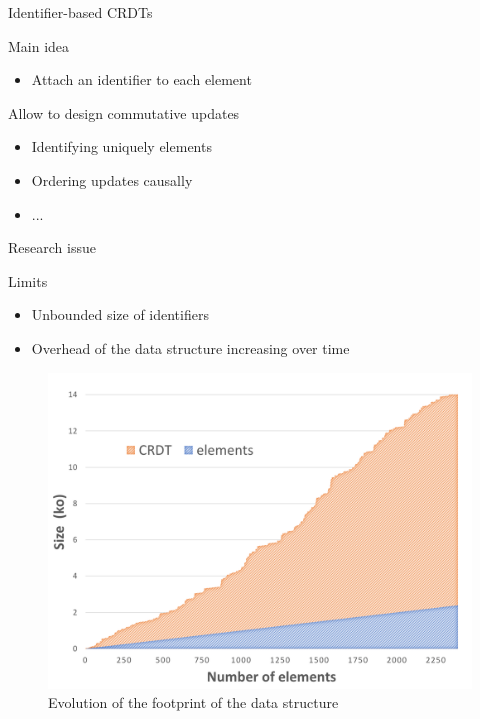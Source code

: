 \documentclass[10pt]{beamer}
\begin{document}
\begin{frame}{Identifier-based \acp{CRDT}}
  \begin{block}{Main idea}
    \begin{itemize}
      \item Attach an identifier to each element
    \end{itemize}
  \end{block}

  \bigskip

  \begin{block}{Allow to design commutative updates}
    \begin{itemize}
      \item Identifying uniquely elements
      \item Ordering updates causally
      \item ...
    \end{itemize}
  \end{block}
\end{frame}

\begin{frame}{Research issue}
  \begin{alertblock}{Limits}
    \begin{itemize}
      \item Unbounded size of identifiers
      \item Overhead of the data structure increasing over time
    \end{itemize}
  \end{alertblock}

  \begin{figure}
    \includegraphics[scale=0.22]{img/footprint-4.png}
    \caption{Evolution of the footprint of the data structure}
  \end{figure}
\end{frame}
\end{document}
